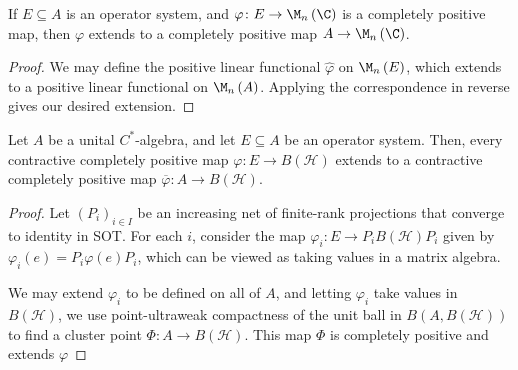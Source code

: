 \documentclass[10pt]{mypackage}
\begin{document}
\begin{corollary}
  If $E\subseteq A$ is an operator system, and $\varphi\colon E\rightarrow \M_n\left( \C \right)$ is a completely positive map, then $\varphi$ extends to a completely positive map $A\rightarrow \M_n\left( \C \right)$.
\end{corollary}
\begin{proof}
  We may define the positive linear functional $\hat{\varphi}$ on $\M_n\left( E \right)$, which extends to a positive linear functional on $\M_n\left( A \right)$. Applying the correspondence in reverse gives our desired extension.
\end{proof}
\begin{theorem}
  Let $A$ be a unital $C^{\ast}$-algebra, and let $E\subseteq A$ be an operator system. Then, every contractive completely positive map $\varphi\colon E\rightarrow B\left( \mathcal{H} \right)$ extends to a contractive completely positive map $ \overline{\varphi}\colon A\rightarrow B\left( \mathcal{H} \right) $.
\end{theorem}
\begin{proof}
  Let $\left( P_i \right)_{i\in I}$ be an increasing net of finite-rank projections that converge to identity in SOT. For each $i$, consider the map $\varphi_i\colon E\rightarrow P_iB\left( \mathcal{H} \right)P_i$ given by $\varphi_i\left( e \right) = P_i\varphi\left( e \right)P_i$, which can be viewed as taking values in a matrix algebra.

  We may extend $ \varphi_i $ to be defined on all of $A$, and letting $\varphi_i$ take values in $B\left( \mathcal{H} \right)$, we use point-ultraweak compactness of the unit ball in $B\left( A,B\left( \mathcal{H} \right) \right)$ to find a cluster point $\Phi\colon A\rightarrow B\left( \mathcal{H} \right)$. This map $\Phi$ is completely positive and extends $\varphi$
\end{proof}
\end{document}
